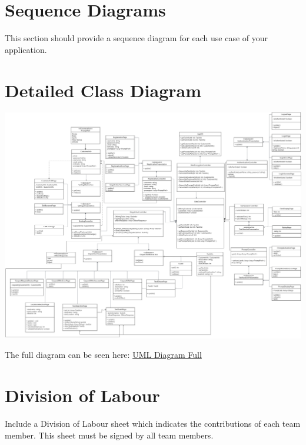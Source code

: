 \documentclass[]{article}
\begin{document}
\section{Sequence Diagrams}
\label{sec:sequence_diagrams}
This section should provide a sequence diagram for each use case of your application.

\section{Detailed Class Diagram}
\label{sec:detailed_class_diagram}
\includegraphics[scale=0.2]{images/UML-ClassDiagram.png}

The full diagram can be seen here: \href{https://cdn.discordapp.com/attachments/1065661481171038298/1087213470207967252/3A04-UML-Diagram.drawio.png}{UML Diagram Full}


\appendix
\section{Division of Labour}
\label{sec:division_of_labour}
Include a Division of Labour sheet which indicates the contributions of each team member. This sheet must be signed by all team members.

\newpage
\end{document}
